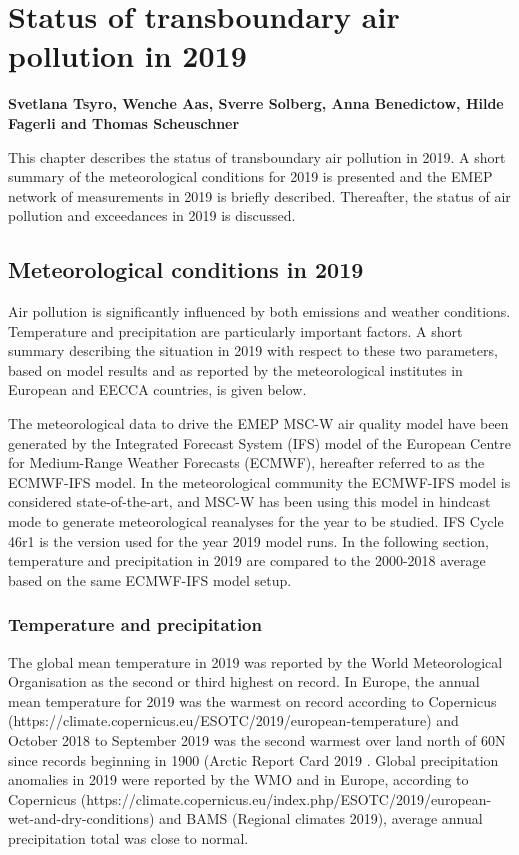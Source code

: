 \chapter[Status in 2019]{Status of transboundary air pollution in 2019}
\label{ch:chapterStatus}


{\bf{Svetlana Tsyro, Wenche Aas, Sverre Solberg, Anna Benedictow, Hilde Fagerli and Thomas Scheuschner}}
\vspace{30pt}

This chapter describes the status of transboundary air pollution in 2019. A short summary of the meteorological conditions for 2019 is presented and the EMEP network of measurements in 2019 is briefly described. Thereafter, the status of air pollution and exceedances in 2019 is discussed.

\section{Meteorological conditions in 2019}
\label{sec:meteo}
Air pollution is significantly influenced by both emissions and weather conditions. Temperature and precipitation are particularly important factors. A short summary describing the situation in 2019 with respect to these two parameters, based on model results and as reported by the meteorological institutes in European and EECCA countries, is given below.

The meteorological data to drive the EMEP MSC-W air quality model have been generated by the Integrated Forecast System (IFS) model of the European Centre for Medium-Range Weather Forecasts (ECMWF), hereafter referred to as the ECMWF-IFS model. In the meteorological community the ECMWF-IFS model is considered state-of-the-art, and MSC-W has been using this model in hindcast mode to generate meteorological reanalyses for the year to be studied. IFS Cycle 46r1 is the version used for the year 2019 model runs. In the following section, temperature and precipitation in 2019 are compared to the 2000-2018 average based on the same ECMWF-IFS model setup.

\subsection{Temperature and precipitation}
The global mean temperature in 2019 was reported by the World Meteorological Organisation \citep{WMO1248:2020} as the second or third highest on record. In Europe, the annual mean temperature for 2019 was the warmest on record according to Copernicus (https://climate.copernicus.eu/ESOTC/2019/european-temperature) and October 2018 to September 2019 was the second warmest over land north of 60\degrees N since records beginning in 1900 (Arctic Report Card 2019 \citep{Overland:ARC2019}.
Global precipitation anomalies in 2019 were reported by the WMO \citep{WMO1248:2020} and in Europe, according to Copernicus (https://climate.copernicus.eu/index.php/ESOTC/2019/european-wet-and-dry-conditions) and BAMS (Regional climates 2019), average annual precipitation total was close to normal.

